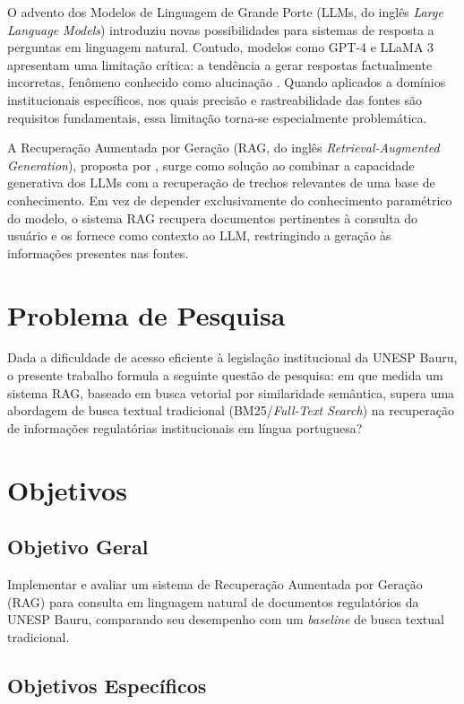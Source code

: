 \documentclass[
  12pt,
  openright,
  twoside,
  a4paper,
  brazil
]{abntex2}
\begin{document}
O advento dos Modelos de Linguagem de Grande Porte (LLMs, do inglês \textit{Large Language Models}) introduziu novas possibilidades para sistemas de resposta a perguntas em linguagem natural. Contudo, modelos como GPT-4 e LLaMA 3 apresentam uma limitação crítica: a tendência a gerar respostas factualmente incorretas, fenômeno conhecido como alucinação \cite{ji2023survey}. Quando aplicados a domínios institucionais específicos, nos quais precisão e rastreabilidade das fontes são requisitos fundamentais, essa limitação torna-se especialmente problemática.

A Recuperação Aumentada por Geração (RAG, do inglês \textit{Retrieval-Augmented Generation}), proposta por , surge como solução ao combinar a capacidade generativa dos LLMs com a recuperação de trechos relevantes de uma base de conhecimento. Em vez de depender exclusivamente do conhecimento paramétrico do modelo, o sistema RAG recupera documentos pertinentes à consulta do usuário e os fornece como contexto ao LLM, restringindo a geração às informações presentes nas fontes.

\section{Problema de Pesquisa}

Dada a dificuldade de acesso eficiente à legislação institucional da UNESP Bauru, o presente trabalho formula a seguinte questão de pesquisa: em que medida um sistema RAG, baseado em busca vetorial por similaridade semântica, supera uma abordagem de busca textual tradicional (BM25/\textit{Full-Text Search}) na recuperação de informações regulatórias institucionais em língua portuguesa?

\section{Objetivos}

\subsection{Objetivo Geral}

Implementar e avaliar um sistema de Recuperação Aumentada por Geração (RAG) para consulta em linguagem natural de documentos regulatórios da UNESP Bauru, comparando seu desempenho com um \textit{baseline} de busca textual tradicional.

\subsection{Objetivos Específicos}
\end{document}
